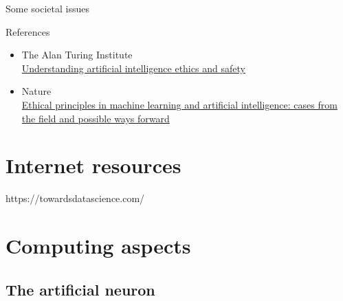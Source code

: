 \documentclass[10pt,serif,mathserif,compress,hyperref={colorlinks}]{beamer}
\begin{document}
\begin{frame}{Some societal issues}

  References
  \begin{itemize}
  \item The Alan Turing Institute\\
    \href{http://arxiv.org/abs/1906.05684}{Understanding artificial intelligence ethics and safety}
  \item Nature\\
    \href{https://www.nature.com/articles/s41599-020-0501-9}{Ethical principles in machine learning and artificial intelligence: cases from the field and possible ways forward}
  \end{itemize}

\end{frame}

\section{Internet resources}

https://towardsdatascience.com/


\section{Computing aspects}

\subsection{The artificial neuron}
\end{document}
